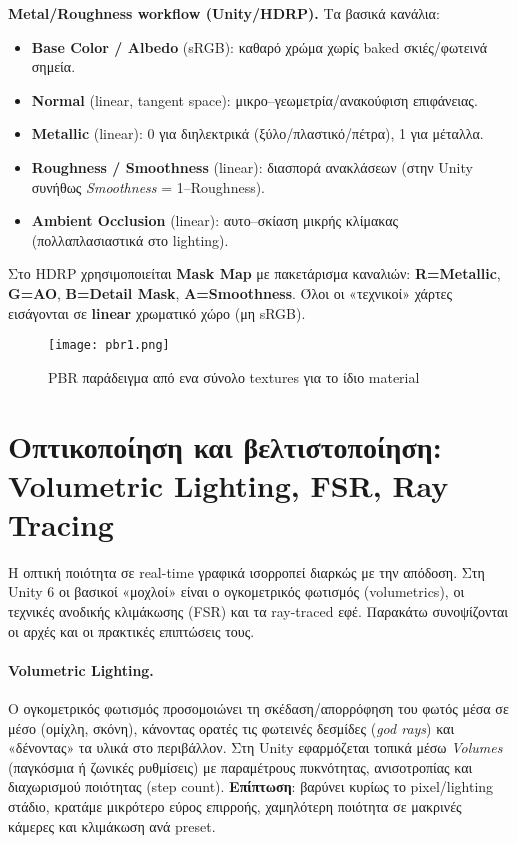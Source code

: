 \textbf{Metal/Roughness workflow (Unity/HDRP).} Τα βασικά κανάλια:
\begin{itemize}
  \item \textbf{Base Color / Albedo} (sRGB): καθαρό χρώμα χωρίς baked σκιές/φωτεινά σημεία.
  \item \textbf{Normal} (linear, tangent space): μικρο–γεωμετρία/ανακούφιση επιφάνειας.
  \item \textbf{Metallic} (linear): 0 για διηλεκτρικά (ξύλο/πλαστικό/πέτρα), 1 για μέταλλα.
  \item \textbf{Roughness / Smoothness} (linear): διασπορά ανακλάσεων (στην Unity συνήθως \emph{Smoothness} = 1–Roughness).
  \item \textbf{Ambient Occlusion} (linear): αυτο–σκίαση μικρής κλίμακας (πολλαπλασιαστικά στο lighting).
\end{itemize}

Στο HDRP χρησιμοποιείται \textbf{Mask Map} με πακετάρισμα καναλιών: \textbf{R=Metallic}, \textbf{G=AO}, \textbf{B=Detail Mask}, \textbf{A=Smoothness}. Όλοι οι «τεχνικοί» χάρτες εισάγονται σε \textbf{linear} χρωματικό χώρο (μη sRGB). 

\begin{figure}[H]
    \centering
    \texttt{[image: pbr1.png]}
    \caption{PBR παράδειγμα από ενα σύνολο textures για το ίδιο material}
    \label{fig:placeholder}
\end{figure}


\section{Οπτικοποίηση και βελτιστοποίηση: Volumetric Lighting, FSR, Ray Tracing}

Η οπτική ποιότητα σε real-time γραφικά ισορροπεί διαρκώς με την απόδοση. Στη Unity 6 οι βασικοί «μοχλοί» είναι ο ογκομετρικός φωτισμός (volumetrics), οι τεχνικές ανοδικής κλιμάκωσης (FSR) και τα ray-traced εφέ. Παρακάτω συνοψίζονται οι αρχές και οι πρακτικές επιπτώσεις τους.

\paragraph{Volumetric Lighting.}
Ο ογκομετρικός φωτισμός προσομοιώνει τη σκέδαση/απορρόφηση του φωτός μέσα σε μέσο (ομίχλη, σκόνη), κάνοντας ορατές τις φωτεινές δεσμίδες (\emph{god rays}) και «δένοντας» τα υλικά στο περιβάλλον. Στη Unity εφαρμόζεται τοπικά μέσω \textit{Volumes} (παγκόσμια ή ζωνικές ρυθμίσεις) με παραμέτρους πυκνότητας, ανισοτροπίας και διαχωρισμού ποιότητας (step count). \textbf{Επίπτωση}: βαρύνει κυρίως το pixel/lighting στάδιο, κρατάμε μικρότερο εύρος επιρροής, χαμηλότερη ποιότητα σε μακρινές κάμερες και κλιμάκωση ανά preset.

